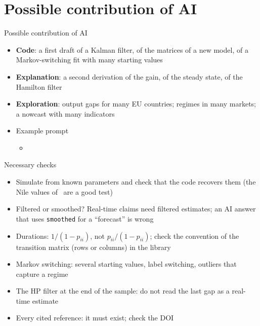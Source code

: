 \section{Possible contribution of AI}

\begin{frame}{Possible contribution of AI}
\itemsize{\small}
\begin{itemize}
    \item \textbf{Code}: a first draft of a Kalman filter, of the matrices of a new model, of a Markov-switching fit with many starting values
    \item \textbf{Explanation}: a second derivation of the gain, of the steady state, of the Hamilton filter
    \item \textbf{Exploration}: output gaps for many EU countries; regimes in many markets; a nowcast with many indicators
    \item Example prompt
    \begin{itemize}
        \item {}
    \end{itemize}
\end{itemize}
\end{frame}

\begin{frame}{Necessary checks}
\itemsize{\small}
\begin{itemize}
    \item Simulate from known parameters and check that the code recovers them (the Nile values of \ are a good test)
    \item Filtered or smoothed? Real-time claims need filtered estimates; an AI answer that uses \texttt{smoothed} for a ``forecast'' is wrong
    \item Durations: $1/(1 - p_{ii})$, not $p_{ii}/(1 - p_{ii})$; check the convention of the transition matrix (rows or columns) in the library
    \item Markov switching: several starting values, label switching, outliers that capture a regime
    \item The HP filter at the end of the sample: do not read the last gap as a real-time estimate
    \item Every cited reference: it must exist; check the DOI
\end{itemize}
\end{frame}


